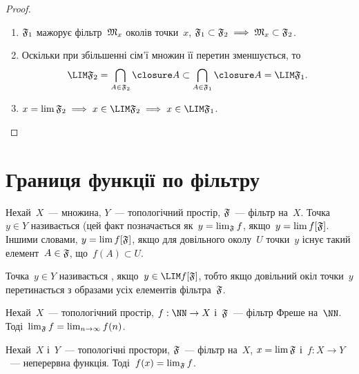 \begin{proof}
    \listhack
    \begin{enumerate}
        \item $\frak F_1$ мажорує фільтр~$\frak M_x$ околів точки~$x$, $\frak F_1 \subset \frak F_2 \implies \frak M_x \subset \frak F_2$.

        \item Оскільки при збільшенні сім'ї множин її перетин зменшується, то
        \begin{equation*}
            \LIM \frak F_2 = \bigcap_{A \in \frak F_2} \closure A \subset \bigcap_{A \in \frak F_1} \closure A = \LIM \frak F_1.
        \end{equation*}

        \item $x = \lim \frak F_2 \implies x \in \LIM \frak F_2 \implies x \in \LIM \frak F_1$. \qedhere
    \end{enumerate}
\end{proof}

\section{Границя функції по фільтру}

\begin{definition}
    Нехай~$X$~--- множина, $Y$~--- топологічний простір, $\frak F$~--- фільтр на~$X$. Точка~$y \in Y$ називається  (цей факт позначається як~$y = \lim_{\frak F} f$, якщо~$y = \lim f[\frak F]$. Іншими словами, $y = \lim f [\frak F]$, якщо для довільного околу~$U$ точки~$y$ існує такий елемент~$A \in \frak F$, що~$f(A) \subset U$.
\end{definition}

\begin{definition}
    Точка~$y \in Y$ називається , якщо~$y \in \LIM f[\frak F]$, тобто якщо довільний окіл точки~$y$ перетинається з образами усіх елементів фільтра~$\frak F$.
\end{definition}

\begin{example}
    Нехай~$X$~--- топологічний простір, $f: \NN \to X$ і~$\frak F$~--- фільтр Фреше на~$\NN$. Тоді~$\lim_{\frak F} f = \lim_{n \to \infty} f(n)$.
\end{example}

\begin{theorem}
    \label{th:filter-continuity}
    Нехай~$X$ і~$Y$~--- топологічні простори, $\frak F$~--- фільтр на~$X$, $x = \lim \frak F$ і~$f: X \to Y$~--- неперервна функція. Тоді~$f(x) = \lim_{\frak F} f$.
\end{theorem}

